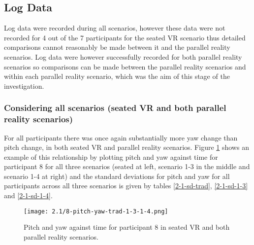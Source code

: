 
\subsection{Log Data}
\label{2-1-log-data}

Log data were recorded during all scenarios, however these data were not recorded for 4 out of the 7 participants for the seated VR scenario thus detailed comparisons cannot reasonably be made between it and the parallel reality scenarios. Log data were however successfully recorded for both parallel reality scenarios so comparisons can be made between the parallel reality scenarios and within each parallel reality scenario, which was the aim of this stage of the investigation.


\subsubsection{Considering all scenarios (seated VR and both parallel reality scenarios)}

For all participants there was once again substantially more yaw change than pitch change, in both seated VR and parallel reality scenarios. Figure \ref{2-1-8-pitch-yaw-trad-1-3-1-4.png} shows an example of this relationship by plotting pitch and yaw against time for participant 8 for all three scenarios (seated at left, scenario 1-3 in the middle and scenario 1-4 at right) and the standard deviations for pitch and yaw for all participants across all three scenarios is given by tables \ref{2-1-sd-trad}, \ref{2-1-sd-1-3} and \ref{2-1-sd-1-4}.

\begin{figure}[h]
	\begin{center}
	\texttt{[image: 2.1/8-pitch-yaw-trad-1-3-1-4.png]}
	\caption{Pitch and yaw against time for participant 8 in seated VR and both parallel reality scenarios.}
	\label{2-1-8-pitch-yaw-trad-1-3-1-4.png}
	\end{center}
\end{figure}

